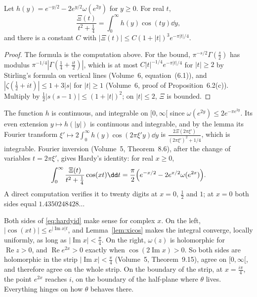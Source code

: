 \begin{lemma}\label{lem:xicos}
Let $h(y)=e^{-y/2}-2e^{y/2}\omega(e^{2y})$ for $y\ge0$. For real $t$,
\[
\frac{\Xi(t)}{t^2+\frac14}=\int_0^\infty h(y)\cos(ty)\dd y,
\]
and there is a constant $C$ with $|\Xi(t)|\le C(1+|t|)^3e^{-\pi|t|/4}$.
\end{lemma}
\begin{proof}
The formula is the computation above. For the bound, $\pi^{-s/2}\Gamma(\frac s2)$ has modulus $\pi^{-1/4}|\Gamma(\frac14+\frac{it}2)|$, which is at most $C|t|^{-1/4}e^{-\pi|t|/4}$ for $|t|\ge2$ by Stirling's formula on vertical lines (Volume~6, equation~(6.1)), and $|\zeta(\frac12+it)|\le1+3|s|$ for $|t|\ge1$ (Volume~6, proof of Proposition~6.2(c)). Multiply by $\frac12|s(s-1)|\le(1+|t|)^2$; on $|t|\le2$, $\Xi$ is bounded.
\end{proof}

The function $h$ is continuous, and integrable on $[0,\infty[$ since $\omega(e^{2y})\le2e^{-\pi e^{2y}}$. Its even extension $y\mapsto h(|y|)$ is continuous and integrable, and by the lemma its Fourier transform $\xi'\mapsto2\int_0^\infty h(y)\cos(2\pi\xi'y)\dd y$ is $\frac{2\Xi(2\pi\xi')}{(2\pi\xi')^2+1/4}$, which is integrable. Fourier inversion (Volume~5, Theorem~8.6), after the change of variables $t=2\pi\xi'$, gives Hardy's identity: for real $x\ge0$,
\begin{equation}\label{eq:hardyid}
\int_0^\infty\frac{\Xi(t)}{t^2+\frac14}\cos(xt)\dd t=\frac\pi2\Bigl(e^{-x/2}-2e^{x/2}\omega(e^{2x})\Bigr).
\end{equation}
A direct computation verifies it to twenty digits at $x=0$, $\frac12$ and $1$; at $x=0$ both sides equal $1.4350248428\ldots$

Both sides of \eqref{eq:hardyid} make sense for complex $x$. On the left, $|\cos(xt)|\le e^{|\operatorname{Im}x|t}$, and Lemma~\ref{lem:xicos} makes the integral converge, locally uniformly, as long as $|\operatorname{Im}x|<\frac\pi4$. On the right, $\omega(z)$ is holomorphic for $\operatorname{Re}z>0$, and $\operatorname{Re}e^{2x}>0$ exactly when $\cos(2\operatorname{Im}x)>0$. So both sides are holomorphic in the strip $|\operatorname{Im}x|<\frac\pi4$ (Volume~5, Theorem~9.15), agree on $[0,\infty[$, and therefore agree on the whole strip. On the boundary of the strip, at $x=\frac{i\pi}4$, the point $e^{2x}$ reaches $i$, on the boundary of the half-plane where $\theta$ lives. Everything hinges on how $\theta$ behaves there.

